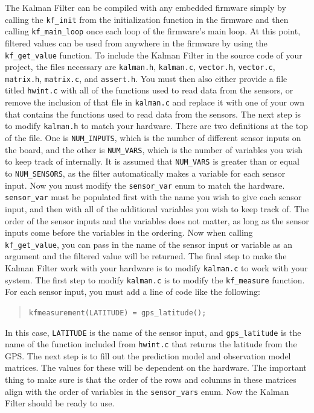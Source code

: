 \documentclass[onecolumn, draftclsnofoot,10pt, compsoc]{IEEEtran}
\begin{document}
The Kalman Filter can be compiled with any embedded firmware simply by calling the \texttt{kf\_init} from the initialization function in the firmware and then calling \texttt{kf\_main\_loop} once each loop of the firmware's main loop.
At this point, filtered values can be used from anywhere in the firmware by using the \texttt{kf\_get\_value} function.
To include the Kalman Filter in the source code of your project, the files necessary are \texttt{kalman.h}, \texttt{kalman.c}, \texttt{vector.h}, \texttt{vector.c}, \texttt{matrix.h}, \texttt{matrix.c}, and \texttt{assert.h}.
You must then also either provide a file titled \texttt{hwint.c} with all of the functions used to read data from the sensors, or remove the inclusion of that file in \texttt{kalman.c} and replace it with one of your own that contains the functions used to read data from the sensors.
The next step is to modify \texttt{kalman.h} to match your hardware.
There are two definitions at the top of the file.
One is \texttt{NUM\_INPUTS}, which is the number of different sensor inputs on the board, and the other is \texttt{NUM\_VARS}, which is the number of variables you wish to keep track of internally.
It is assumed that \texttt{NUM\_VARS} is greater than or equal to \texttt{NUM\_SENSORS}, as the filter automatically makes a variable for each sensor input.
Now you must modify the \texttt{sensor\_var} enum to match the hardware.
\texttt{sensor\_var} must be populated first with the name you wish to give each sensor input, and then with all of the additional variables you wish to keep track of.
The order of the sensor inputs and the variables does not matter, as long as the sensor inputs come before the variables in the ordering.
Now when calling \texttt{kf\_get\_value}, you can pass in the name of the sensor input or variable as an argument and the filtered value will be returned.
The final step to make the Kalman Filter work with your hardware is to modify \texttt{kalman.c} to work with your system.
The first step to modify \texttt{kalman.c} is to modify the \texttt{kf\_measure} function.
For each sensor input, you must add a line of code like the following:
\begin{quote}
  \texttt{kfmeasurement(LATITUDE) = gps\_latitude();}
\end{quote}
In this case, \texttt{LATITUDE} is the name of the sensor input, and \texttt{gps\_latitude} is the name of the function included from \texttt{hwint.c} that returns the latitude from the GPS.
The next step is to fill out the prediction model and observation model matrices.
The values for these will be dependent on the hardware.
The important thing to make sure is that the order of the rows and columns in these matrices align with the order of variables in the \texttt{sensor\_vars} enum.
Now the Kalman Filter should be ready to use.
\end{document}

